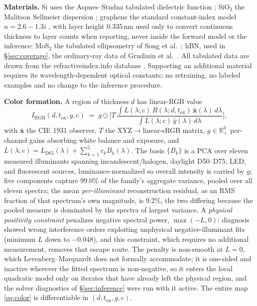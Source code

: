 \documentclass[10pt]{article}
\begin{document}
\textbf{Materials.} Si uses the Aspnes--Studna tabulated dielectric function \cite{aspnes1983}; SiO$_2$ the Malitson Sellmeier dispersion \cite{malitson1965}; graphene the standard constant-index model $n=2.6-1.3i$ \cite{blake2007}, with layer height $0.335$\,nm used only to convert continuous thickness to layer counts when reporting, never inside the forward model or the inference; MoS$_2$ the tabulated ellipsometry of Song et al.\ \cite{song2019}; hBN, used in \S\ref{sec:coverage}, the ordinary-ray data of Grudinin et al.\ \cite{grudinin2023}. All tabulated data are drawn from the refractiveindex.info database \cite{polyanskiy2024}. Supporting an additional material requires its wavelength-dependent optical constants; no retraining, no labeled examples and no change to the inference procedure.

\textbf{Color formation.} A region of thickness $d$ has linear-RGB value
\begin{equation}\label{eq:color}
I_{\mathrm{RGB}}(d,t_{\mathrm{ox}},g,c) \;=\; g \odot \Bigg[ T\,\frac{\int L(\lambda;c)\,R(\lambda;d,t_{\mathrm{ox}})\,\bar{\mathbf{x}}(\lambda)\,d\lambda}{\int L(\lambda;c)\,\bar{y}(\lambda)\,d\lambda} \Bigg],
\end{equation}
with $\bar{\mathbf{x}}$ the CIE 1931 observer, $T$ the XYZ$\to$linear-sRGB matrix, $g\in\mathbb{R}^3_{+}$ per-channel gains absorbing white balance and exposure, and $L(\lambda;c)=L_{\mathrm{D65}}(\lambda)+\sum_{k=1}^{5}c_k B_k(\lambda)$. The basis $\{B_k\}$ is a PCA over eleven measured illuminants spanning incandescent/halogen, daylight D50--D75, LED, and fluorescent sources, luminance-normalized so overall intensity is carried by $g$; five components capture 99.0\% of the family's aggregate variance, pooled over all eleven spectra; the mean \emph{per-illuminant} reconstruction residual, as an RMS fraction of that spectrum's own magnitude, is 9.2\%, the two differing because the pooled measure is dominated by the spectra of largest variance. A \emph{physical positivity constraint} penalizes negative spectral power, $\max(-L,0)$: diagnosis showed wrong interference orders exploiting unphysical negative-illuminant fits (minimum $L$ down to $-0.048$), and this constraint, which requires no additional measurement, removes that escape route. The penalty is non-smooth at $L=0$, which Levenberg--Marquardt does not formally accommodate; it is one-sided and inactive wherever the fitted spectrum is non-negative, so it enters the local quadratic model only on iterates that have already left the physical region, and the solver diagnostics of \S\ref{sec:inference} were run with it active. The entire map \eqref{eq:color} is differentiable in $(d,t_{\mathrm{ox}},g,c)$.
\end{document}
